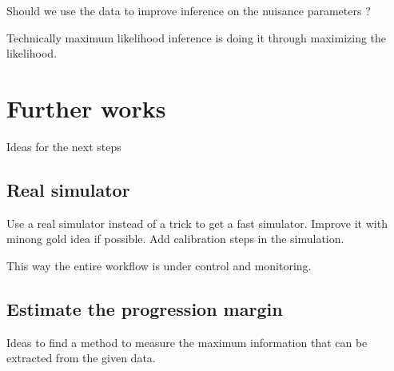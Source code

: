 Should we use the data to improve inference on the nuisance parameters ?

Technically maximum likelihood inference is doing it through maximizing the likelihood.


\section{Further works} %
\label{sec:further_works}

Ideas for the next steps

\subsection{Real simulator} %
\label{sub:real_simulator}

Use a real simulator instead of a trick to get a fast simulator.
Improve it with minong gold idea if possible.
Add calibration steps in the simulation.

This way the entire workflow is under control and monitoring.



\subsection{Estimate the progression margin} %
\label{sub:estimate_the_progression_margin}

Ideas to find a method to measure the maximum information that can be extracted from the given data.






